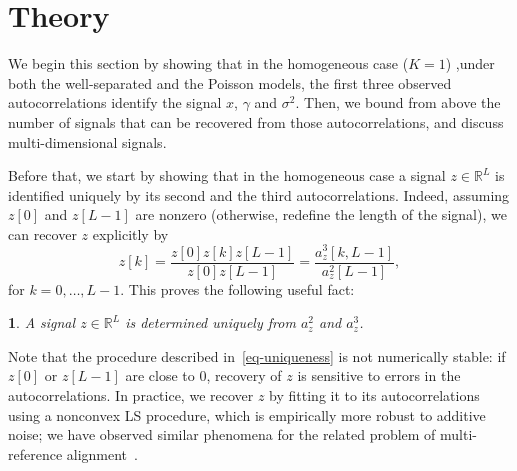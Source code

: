 \documentclass[12pt]{article}
\newcommand{\1}{\mathbf{1}}
\newcommand{\RL}{\mathbb{R}^L}
\theoremstyle{plain}
\theoremstyle{definition}
\theoremstyle{remark}
\theoremstyle{plain}
\theoremstyle{remark}
\theoremstyle{plain}
\theoremstyle{plain}
\theoremstyle{plain}
\newtheorem{proposition}[thm]{\protect\propositionname}
\providecommand{\propositionname}{Proposition}
\numberwithin{equation}{section}
\begin{document}
%

\section{Theory}

We begin this section by showing that in the homogeneous case ($K=1$) ,under both the well-separated and the Poisson models, the first three observed autocorrelations  identify the signal $x$, $\gamma$ and $\sigma^2$.  Then, we bound from above the number of signals that can be recovered from those autocorrelations, and discuss multi-dimensional signals.

Before that, we start by showing that in the homogeneous case a signal $z\in\RL$ is identified uniquely by its second and the third autocorrelations.
 Indeed, assuming $z[0]$ and $z[L-1]$ are nonzero (otherwise, redefine the length of the signal), we can recover $z$ explicitly by 
\begin{equation}
%
z[k]  = \frac{z[0]z[k]z[L-1]}{z[0]z[L-1]} = \frac{a_z^3[k,L-1]}{a_z^2[L-1]},
\label{eq-uniqueness}
%
\end{equation}
for $k = 0, \ldots, L-1$.
This proves the following useful fact:
\begin{proposition} \label{prop:uniqueness}
	A signal $z\in\RL$ is determined uniquely from  $a_z^2$ and $a_z^3$. 
\end{proposition}

Note that the procedure described in~\eqref{eq-uniqueness} is not numerically stable: if $z[0]$ or $z[L-1]$ are close to 0, recovery of $z$ is sensitive to errors in the autocorrelations. In practice, we recover $z$ by fitting it to its autocorrelations using a nonconvex LS procedure, which is empirically more robust to additive noise; we have observed similar phenomena for the related problem of multi-reference alignment~\cite{bendory2017bispectrum,boumal2017heterogeneous,abbe2017multireference}.
\end{document}
